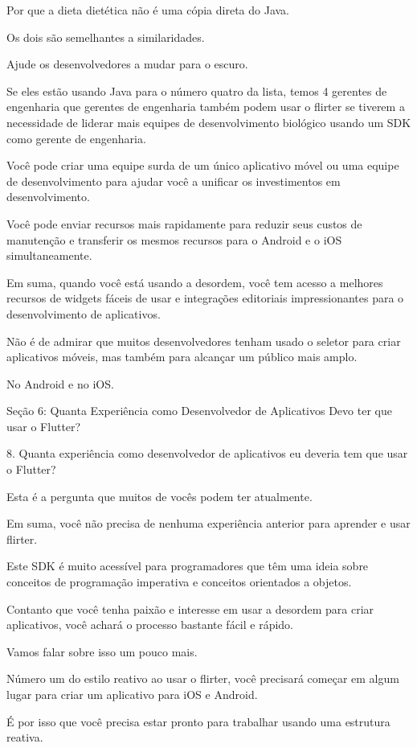 Por que a dieta dietética não é uma cópia direta do Java.

Os dois são semelhantes a similaridades.

Ajude os desenvolvedores a mudar para o escuro.

Se eles estão usando Java para o número quatro da lista, temos 4 gerentes de engenharia que gerentes de engenharia também podem usar o flirter se tiverem a necessidade de liderar mais equipes de desenvolvimento biológico usando um SDK como gerente de engenharia.

Você pode criar uma equipe surda de um único aplicativo móvel ou uma equipe de desenvolvimento para ajudar você a unificar os investimentos em desenvolvimento.

Você pode enviar recursos mais rapidamente para reduzir seus custos de manutenção e transferir os mesmos recursos para o Android e o iOS simultaneamente.

Em suma, quando você está usando a desordem, você tem acesso a melhores recursos de widgets fáceis de usar e integrações editoriais impressionantes para o desenvolvimento de aplicativos.

Não é de admirar que muitos desenvolvedores tenham usado o seletor para criar aplicativos móveis, mas também para alcançar um público mais amplo.

No Android e no iOS.

Seção 6: Quanta Experiência como Desenvolvedor de Aplicativos
Devo ter que usar o Flutter?

8. Quanta experiência como desenvolvedor de aplicativos eu deveria
tem que usar o Flutter?

Esta é a pergunta que muitos de vocês podem ter atualmente.

Em suma, você não precisa de nenhuma experiência anterior para aprender e usar flirter.

Este SDK é muito acessível para programadores que têm uma ideia sobre conceitos de programação imperativa e conceitos orientados a objetos.

Contanto que você tenha paixão e interesse em usar a desordem para criar aplicativos, você achará o processo bastante fácil e rápido.

Vamos falar sobre isso um pouco mais.

Número um do estilo reativo ao usar o flirter, você precisará começar em algum lugar para criar um aplicativo para iOS e Android.

É por isso que você precisa estar pronto para trabalhar usando uma estrutura reativa.


